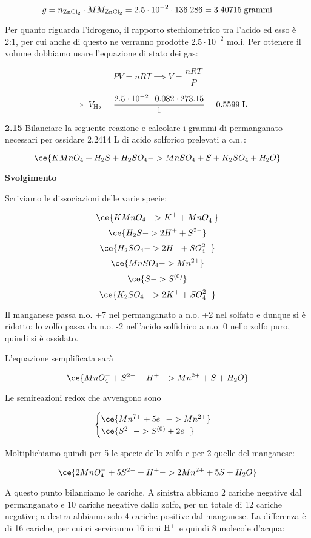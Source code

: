 $$g=n_{\rm ZnCl_2} \cdot MM_{\rm ZnCl_2}
=2.5 \cdot 10^{-2} \cdot 136.286
=3.40715 \; \rm grammi$$

Per quanto riguarda l'idrogeno, il rapporto stechiometrico tra l'acido ed esso è 2:1, per cui anche di questo ne verranno prodotte $2.5 \cdot 10^{-2}$ moli. Per ottenere il volume dobbiamo usare l'equazione di stato dei gas:

$$PV=nRT \implies V=\frac{nRT}{P}$$

$$\implies V_{\rm H_2}
=\frac{2.5 \cdot 10^{-2} \cdot 0.082 \cdot 273.15}{1}
=0.5599 \; \rm L$$

\vspace{0.2cm}\textbf{2.15} Bilanciare la seguente reazione e calcolare i grammi di permanganato necessari per ossidare 2.2414 L di acido solforico prelevati a c.n.\,:

$$\ce{KMnO_4 + H_2S + H_2SO_4 -> MnSO_4 + S + K_2SO_4 + H_2O}$$

\large\textbf{Svolgimento}\normalsize

\vspace{0.2cm}Scriviamo le dissociazioni delle varie specie:

$$\ce{KMnO_4 -> K^+ + MnO_4^-}$$
$$\ce{H_2S -> 2H^+ + S^{2-}}$$
$$\ce{H_2SO_4 -> 2H^+ + SO_4^{2-}}$$
$$\ce{MnSO_4 -> Mn^{2+}}$$
$$\ce{S -> S^{(0)}}$$
$$\ce{K_2SO_4 -> 2K^+ + SO_4^{2-}}$$

Il manganese passa n.o. +7 nel permanganato a n.o. +2 nel solfato e dunque si è ridotto; lo zolfo passa da n.o. -2 nell'acido solfidrico a n.o. 0 nello zolfo puro, quindi si è ossidato.

L'equazione semplificata sarà

$$\ce{MnO_4^- + S^{2-} + H^+ -> Mn^{2+} + S + H_2O}$$

Le semireazioni redox che avvengono sono

$$\begin{cases}
    \ce{Mn^{7+} + 5e^- -> Mn^{2+}}\\
    \ce{S^{2-} -> S^{(0)} + 2e^-}
\end{cases}$$

Moltiplichiamo quindi per 5 le specie dello zolfo e per 2 quelle del manganese:

$$\ce{2MnO_4^- + 5S^{2-} + H^+ -> 2Mn^{2+} + 5S + H_2O}$$

A questo punto bilanciamo le cariche. A sinistra abbiamo 2 cariche negative dal permanganato e 10 cariche negative dallo zolfo, per un totale di 12 cariche negative; a destra abbiamo solo 4 cariche positive dal manganese. La differenza è di 16 cariche, per cui ci serviranno 16 ioni $\rm H^+$ e quindi 8 molecole d'acqua:

